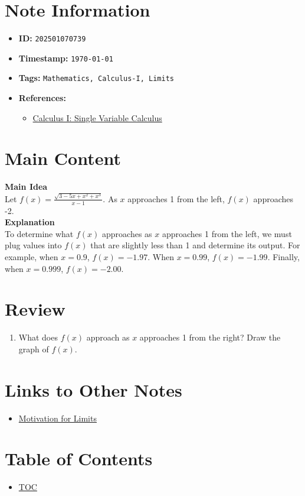 \clearpage
{}
\label{202501070739}
\renewcommand{\notetitle}{Moving Closer and Closer}

\section*{Note Information}
\begin{itemize}
  \item \textbf{ID:} \texttt{202501070739}
  \item \textbf{Timestamp:} \texttt{\today \ \currenttime}
  \item \textbf{Tags:} \texttt{Mathematics, Calculus-I, Limits}
  \item \textbf{References:}
    \begin{itemize}
      \item \href{https://ocw.mit.edu/courses/18-01-calculus-i-single-variable-calculus-fall-2020/}{Calculus I: Single Variable Calculus}
    \end{itemize}
\end{itemize}


\section*{Main Content}
\textbf{Main Idea}\\
Let $f(x) = \frac{\sqrt{3-5x+x^2+x^3}}{x-1}$. As $x$ approaches 1 from the left, $f(x)$ approaches -2. \\

\textbf{Explanation}\\
To determine what $f(x)$ approaches as $x$ approaches 1 from the left, we must plug values into $f(x)$ that are slightly less than 1 and determine its output.
For example, when $x = 0.9$, $f(x) = -1.97$. When $x = 0.99$, $f(x) = -1.99$. Finally, when $x = 0.999$, $f(x) = -2.00$. \\

\section*{Review}
\begin{enumerate}
  \item What does $f(x)$ approach as $x$ approaches 1 from the right? Draw the graph of $f(x)$. 
\end{enumerate}


\section*{Links to Other Notes}
\begin{itemize}
  \item \hyperref[202501050700]{Motivation for Limits}
\end{itemize}

\section*{Table of Contents}
\begin{itemize}
  \item \hyperref[toc]{TOC}
\end{itemize}

